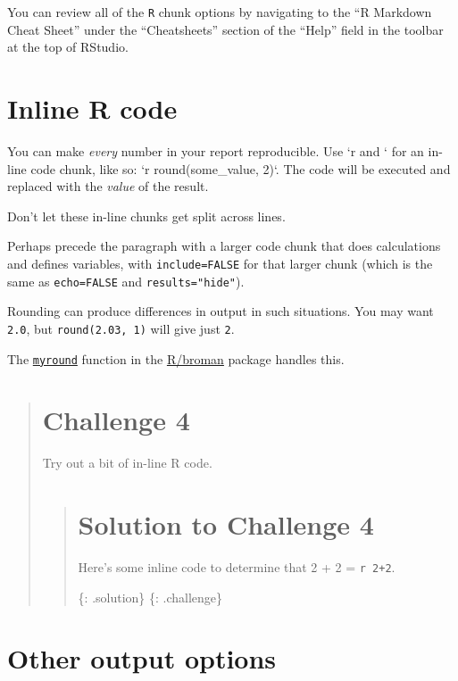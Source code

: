 \documentclass[]{book}
\begin{document}
You can review all of the \texttt{R} chunk options by navigating to the
``R Markdown Cheat Sheet'' under the ``Cheatsheets'' section of the
``Help'' field in the toolbar at the top of RStudio.

\section{Inline R code}\label{inline-r-code}

You can make \emph{every} number in your report reproducible. Use `r and
` for an in-line code chunk, like so: `r round(some\_value, 2)`. The
code will be executed and replaced with the \emph{value} of the result.

Don't let these in-line chunks get split across lines.

Perhaps precede the paragraph with a larger code chunk that does
calculations and defines variables, with \texttt{include=FALSE} for that
larger chunk (which is the same as \texttt{echo=FALSE} and
\texttt{results="hide"}).

Rounding can produce differences in output in such situations. You may
want \texttt{2.0}, but \texttt{round(2.03,\ 1)} will give just
\texttt{2}.

The
\href{https://github.com/kbroman/broman/blob/master/R/myround.R}{\texttt{myround}}
function in the \href{https://github.com/kbroman/broman}{R/broman}
package handles this.

\begin{quote}
\section{Challenge 4}\label{challenge-4}

Try out a bit of in-line R code.

\begin{quote}
\section{Solution to Challenge 4}\label{solution-to-challenge-4}

Here's some inline code to determine that 2 + 2 =
\texttt{\textasciigrave{}r\ 2+2\textasciigrave{}}.

\{: .solution\} \{: .challenge\}
\end{quote}
\end{quote}

\section{Other output options}\label{other-output-options}
\end{document}
